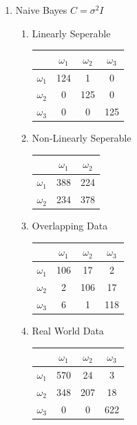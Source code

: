 \documentclass[a4paper]{article}
\begin{document}
\begin{enumerate}
\item Naive Bayes $C = \sigma^2I$
\begin{multicols}{2}
\begin{enumerate}
\item Linearly Seperable

\begin{tabular}{ l | c | c | c | }

& $\omega_1$ & $\omega_2$ & $\omega_3$ \\
\hline
  $\omega_1$ & 124 & 1 & 0 \\ 
\hline
  $\omega_2$ & 0 & 125 & 0 \\
\hline
  $\omega_3$ & 0 & 0 & 125 \\
\hline
\end{tabular}

\item Non-Linearly Seperable

\begin{tabular}{ l | c | c |}

& $\omega_1$ & $\omega_2$ \\
\hline
  $\omega_1$ & 388 & 224 \\ 
\hline
  $\omega_2$ & 234 & 378 \\
\hline
\end{tabular}
\newline

\item Overlapping Data

\begin{tabular}{ l | c | c | c | }

& $\omega_1$ & $\omega_2$ & $\omega_3$ \\
\hline
  $\omega_1$ & 106 & 17 & 2 \\ 
\hline
  $\omega_2$ & 2 & 106 & 17 \\
\hline
  $\omega_3$ & 6 & 1 & 118 \\
\hline
\end{tabular}

\item Real World Data

\begin{tabular}{ l | c | c | c | }
& $\omega_1$ & $\omega_2$ & $\omega_3$ \\
\hline
  $\omega_1$ & 570 & 24 & 3 \\ 
\hline
  $\omega_2$ & 348 & 207 & 18 \\
\hline
  $\omega_3$ & 0 & 0 & 622 \\
\hline
\end{tabular}
\end{enumerate}
\end{multicols}


\end{enumerate}
\end{document}

